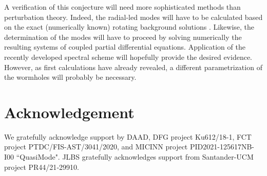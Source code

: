 \documentclass[aps,prd,12pt,superscriptaddress]{revtex4-2}
\begin{document}
A verification of this conjecture will need more sophisticated methods than perturbation theory.
Indeed, the radial-led modes will have to be calculated based on the exact (numerically known) rotating background solutions \cite{Kleihaus:2014dla,Chew:2016epf}.
Likewise, the determination of the modes will have to proceed by solving numerically the resulting systems of coupled partial differential equations.
Application of the recently developed spectral scheme \cite{Blazquez-Salcedo:2023hwg,Khoo:2024yeh} will hopefully provide the desired evidence.
However, as first calculations have already revealed, a different parametrization of the wormholes will probably be necessary.






\section*{Acknowledgement}
We gratefully acknowledge support by DAAD, DFG project Ku612/18-1, 
FCT project PTDC/FIS-AST/3041/2020, and MICINN project PID2021-125617NB-I00 ``QuasiMode".
JLBS gratefully acknowledges support from Santander-UCM project PR44/21‐29910.
\end{document}
